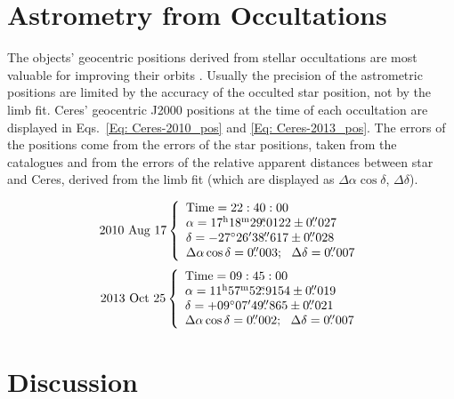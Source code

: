 \documentclass[useAMS,usenatbib]{mn2e}
\begin{document}
\section{Astrometry from Occultations}

The objects' geocentric positions derived from stellar occultations are most valuable for improving their orbits \citep{Desmars2015}. Usually the precision of the astrometric positions are limited by the accuracy of the occulted star position, not by the limb fit. Ceres' geocentric J2000 positions at the time of each occultation are displayed in Eqs.~\ref{Eq: Ceres-2010_pos} and \ref{Eq: Ceres-2013_pos}. The errors of the positions come from the errors of the star positions, taken from the catalogues and from the errors of the relative apparent distances between star and Ceres, derived from the limb fit (which are displayed as $\Delta\alpha \cos\delta$, $\Delta\delta$).

\begin{equation}
2010 ~ \text{Aug} ~ 17
\left\{
 \begin{array}{l l}
    \text{Time} = 22:40:00\\
    \alpha = 17^{\rmn{h}}18^{\rmn{m}}29\fs0122\pm0\farcs027\\
    \delta = -27\degr 26\arcmin 38\farcs617\pm0\farcs028\\
    \Delta\alpha\cos\delta = 0\farcs003; ~~\Delta\delta = 0\farcs007
  \end{array}
\right.
\label{Eq: Ceres-2010_pos}
\end{equation}
\begin{equation}
2013 ~ \text{Oct} ~ 25
\left\{
  \begin{array}{l l}
    \text{Time} = 09:45:00\\
    \alpha = 11^{\rmn{h}}57^{\rmn{m}}52\fs9154\pm0\farcs019\\
    \delta = +09\degr 07\arcmin 49\farcs865\pm0\farcs021\\
    \Delta\alpha\cos\delta = 0\farcs002; ~~\Delta\delta = 0\farcs007
  \end{array}
\right.
\label{Eq: Ceres-2013_pos}
\end{equation}




\section{Discussion}
\end{document}

